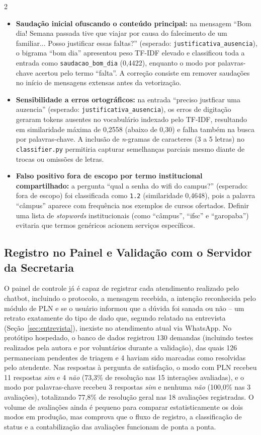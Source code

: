 \documentclass[10pt]{article}
\begin{document}
\begin{multicols}{2}
\begin{itemize}
  \item \textbf{Saudação inicial ofuscando o conteúdo principal:} na mensagem ``Bom dia! Semana passada tive que viajar por causa do falecimento de um familiar... Posso justificar essas faltas?'' (esperado: \texttt{justificativa\_ausencia}), o bigrama ``bom dia'' apresentou peso TF-IDF elevado e classificou toda a entrada como \texttt{saudacao\_bom\_dia} (0,4422), enquanto o modo por palavras-chave acertou pelo termo ``falta''. A correção consiste em remover saudações no início de mensagens extensas antes da vetorização.

  \item \textbf{Sensibilidade a erros ortográficos:} na entrada ``preciso justficar uma auzencia'' (esperado: \texttt{justificativa\_ausencia}), os erros de digitação geraram tokens ausentes no vocabulário indexado pelo TF-IDF, resultando em similaridade máxima de 0,2558 (abaixo de 0,30) e falha também na busca por palavras-chave. A inclusão de \textit{n}-gramas de caracteres (3 a 5 letras) no \texttt{classifier.py} permitiria capturar semelhanças parciais mesmo diante de trocas ou omissões de letras.

  \item \textbf{Falso positivo fora de escopo por termo institucional compartilhado:} a pergunta ``qual a senha do wifi do campus?'' (esperado: fora de escopo) foi classificada como \texttt{1.2} (similaridade 0,4648), pois a palavra ``câmpus'' aparece com frequência nos exemplos de cursos ofertados. Definir uma lista de \textit{stopwords} institucionais (como ``câmpus'', ``ifsc'' e ``garopaba'') evitaria que termos genéricos acionem serviços específicos.
\end{itemize}

\subsection{Registro no Painel e Validação com o Servidor da Secretaria}

O painel de controle já é capaz de registrar cada atendimento realizado
pelo chatbot, incluindo o protocolo, a mensagem recebida, a intenção reconhecida pelo módulo de PLN e se o usuário informou que a dúvida foi sanada ou não -- um retrato exatamente do tipo de dado que, segundo
relatado na entrevista (Seção~\ref{sec:entrevista}), inexiste no atendimento atual via
WhatsApp. No protótipo hospedado, o banco de dados registrou 130 demandas
(incluindo testes realizados pela autora e por voluntários durante a
validação), das quais 126 permaneciam pendentes de triagem e 4 haviam sido marcadas
como resolvidas pelo atendente. Nas respostas à pergunta de satisfação,
o modo com PLN recebeu 11 respostas \textit{sim} e 4 \textit{não}
(73,3\% de resolução nas 15 interações avaliadas), e o modo por
palavras-chave recebeu 3 respostas \textit{sim} e nenhuma \textit{não}
(100,0\% nas 3 avaliações), totalizando 77,8\% de resolução geral nas 18
avaliações registradas. O volume de avaliações ainda é pequeno para
comparar estatisticamente os dois modos em produção, mas comprova que o
fluxo de registro, a classificação de status e a contabilização das
avaliações funcionam de ponta a ponta.


\end{multicols}
\end{document}

